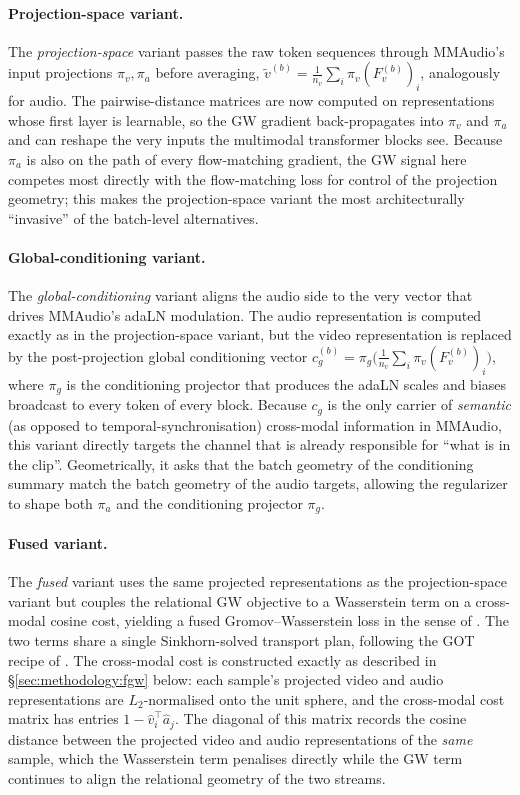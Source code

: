 \paragraph{Projection-space variant.}
The \emph{projection-space} variant passes the raw token sequences
through MMAudio's input projections $\pi_v, \pi_a$ before
averaging,
$\tilde v^{(b)} = \tfrac{1}{n_v} \sum_i \pi_v(F_v^{(b)})_i$,
analogously for audio. The pairwise-distance matrices are now
computed on representations whose first layer is learnable, so
the GW gradient back-propagates into $\pi_v$ and $\pi_a$ and can
reshape the very inputs the multimodal transformer blocks see.
Because $\pi_a$ is also on the path of every flow-matching
gradient, the GW signal here competes most directly with the
flow-matching loss for control of the projection geometry; this
makes the projection-space variant the most architecturally
``invasive'' of the batch-level alternatives.

\paragraph{Global-conditioning variant.}
The \emph{global-conditioning} variant aligns the audio side to
the very vector that drives MMAudio's adaLN modulation. The audio
representation is computed exactly as in the projection-space
variant, but the video representation is replaced by the
post-projection global conditioning vector
$c_g^{(b)} = \pi_g\bigl(\tfrac{1}{n_v} \sum_i \pi_v(F_v^{(b)})_i\bigr)$,
where $\pi_g$ is the conditioning projector that produces the
adaLN scales and biases broadcast to every token of every block.
Because $c_g$ is the only carrier of \emph{semantic} (as opposed
to temporal-synchronisation) cross-modal information in MMAudio,
this variant directly targets the channel that is already
responsible for ``what is in the clip''. Geometrically, it asks
that the batch geometry of the conditioning summary match the
batch geometry of the audio targets, allowing the regularizer to
shape both $\pi_a$ and the conditioning projector $\pi_g$.

\paragraph{Fused variant.}
The \emph{fused} variant uses the same projected representations
as the projection-space variant but couples the relational GW
objective to a Wasserstein term on a cross-modal cosine cost,
yielding a fused Gromov--Wasserstein loss in the sense of
\citet{vayer_2019_optimal, vayer_2019_fused}. The two terms share
a single Sinkhorn-solved transport plan, following the GOT recipe
of \citet{chen_2020_graph}. The cross-modal cost is constructed
exactly as described in \S\ref{sec:methodology:fgw} below: each
sample's projected video and audio representations are
$L_2$-normalised onto the unit sphere, and the cross-modal cost
matrix has entries $1 - \hat v_i^{\!\top} \hat a_j$. The diagonal
of this matrix records the cosine distance between the projected
video and audio representations of the \emph{same} sample, which
the Wasserstein term penalises directly while the GW term
continues to align the relational geometry of the two streams.

